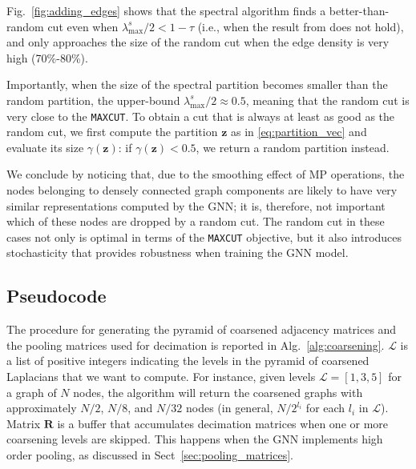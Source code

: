 \documentclass[journal]{IEEEtran}
\def\z{{\mathbf z}}
\newcommand{\maxcut}{\texttt{\small{MAXCUT}}}
\begin{document}
Fig.~\ref{fig:adding_edges} shows that the spectral algorithm finds a better-than-random cut even when $\lambda^s_\text{max}/2 < 1-\tau$ (i.e., when the result from \cite{trevisan2012max} does not hold), and only approaches the size of the random cut when the edge density is very high (70\%-80\%). 

Importantly, when the size of the spectral partition becomes smaller than the random partition, the upper-bound $\lambda^s_\text{max}/2 \approx 0.5$, meaning that the random cut is very close to the \maxcut{}.
To obtain a cut that is always at least as good as the random cut, we first compute the partition $\z$ as in \eqref{eq:partition_vec} and evaluate its size $\gamma(\z)$: if $\gamma(\z) < 0.5$, we return a random partition instead.


We conclude by noticing that, due to the smoothing effect of MP operations, the nodes belonging to densely connected graph components are likely to have very similar representations computed by the GNN; it is, therefore, not important which of these nodes are dropped by a random cut.
The random cut in these cases not only is optimal in terms of the \maxcut{} objective, but it also introduces stochasticity that provides robustness when training the GNN model.

\subsection{Pseudocode}
\label{sec:pseudocode}

The procedure for generating the pyramid of coarsened adjacency matrices and the pooling matrices used for decimation is reported in Alg.~\ref{alg:coarsening}.
$\mathcal{L}$ is a list of positive integers indicating the levels in the pyramid of coarsened Laplacians that we want to compute. For instance, given levels $\mathcal{L} = [1, 3, 5]$ for a graph of $N$ nodes, the algorithm will return the coarsened graphs with approximately $N/2$, $N/8$, and $N/32$ nodes (in general, $N/2^{l_i}$ for each $l_i$ in $\mathcal{L}$). 
Matrix $\mathbf{R}$ is a buffer that accumulates decimation matrices when one or more coarsening levels are skipped. 
This happens when the GNN implements high order pooling, as discussed in Sect~\ref{sec:pooling_matrices}.
\end{document}
